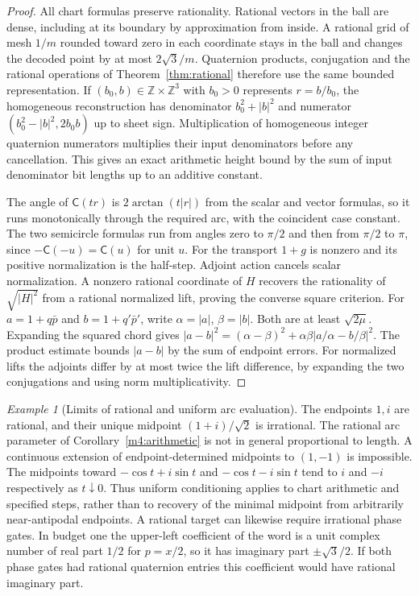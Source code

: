 \documentclass[11pt,reqno]{amsart}
\theoremstyle{definition}
\theoremstyle{remark}
\newtheorem{example}[theorem]{Example}
\numberwithin{equation}{section}
\newcommand{\Cay}{\mathsf{C}}
\begin{document}
\begin{proof}
All chart formulas preserve rationality. Rational vectors in the ball are dense, including at its boundary by approximation from inside. A rational grid of mesh $1/m$ rounded toward zero in each coordinate stays in the ball and changes the decoded point by at most $2\sqrt3/m$. Quaternion products, conjugation and the rational operations of Theorem~\ref{thm:rational} therefore use the same bounded representation. If $(b_0,b)\in\mathbb Z\times\mathbb Z^3$ with $b_0>0$ represents $r=b/b_0$, the homogeneous reconstruction has denominator $b_0^2+|b|^2$ and numerator $(b_0^2-|b|^2,2b_0b)$ up to sheet sign. Multiplication of homogeneous integer quaternion numerators multiplies their input denominators before any cancellation. This gives an exact arithmetic height bound by the sum of input denominator bit lengths up to an additive constant.

The angle of $\Cay(tr)$ is $2\arctan(t|r|)$ from the scalar and vector formulas, so it runs monotonically through the required arc, with the coincident case constant. The two semicircle formulas run from angles zero to $\pi/2$ and then from $\pi/2$ to $\pi$, since $-\Cay(-u)=\Cay(u)$ for unit $u$. For the transport $1+g$ is nonzero and its positive normalization is the half-step. Adjoint action cancels scalar normalization. A nonzero rational coordinate of $H$ recovers the rationality of $\sqrt{|H|^2}$ from a rational normalized lift, proving the converse square criterion.
For $a=1+q\bar p$ and $b=1+q'\bar p'$, write $\alpha=|a|$, $\beta=|b|$. Both are at least $\sqrt{2\mu}$. Expanding the squared chord gives $|a-b|^2=(\alpha-\beta)^2+\alpha\beta|a/\alpha-b/\beta|^2$. The product estimate bounds $|a-b|$ by the sum of endpoint errors. For normalized lifts the adjoints differ by at most twice the lift difference, by expanding the two conjugations and using norm multiplicativity.
\end{proof}

\begin{example}[Limits of rational and uniform arc evaluation]\label{m4:obstructions}
The endpoints $1,i$ are rational, and their unique midpoint $(1+i)/\sqrt2$ is irrational. The rational arc parameter of Corollary~\ref{m4:arithmetic} is not in general proportional to length. A continuous extension of endpoint-determined midpoints to $(1,-1)$ is impossible. The midpoints toward $-\cos t+i\sin t$ and $-\cos t-i\sin t$ tend to $i$ and $-i$ respectively as $t\downarrow0$. Thus uniform conditioning applies to chart arithmetic and specified steps, rather than to recovery of the minimal midpoint from arbitrarily near-antipodal endpoints. A rational target can likewise require irrational phase gates. In budget one the upper-left coefficient of the word is a unit complex number of real part $1/2$ for $p=x/2$, so it has imaginary part $\pm\sqrt3/2$. If both phase gates had rational quaternion entries this coefficient would have rational imaginary part.
\end{example}
\end{document}
